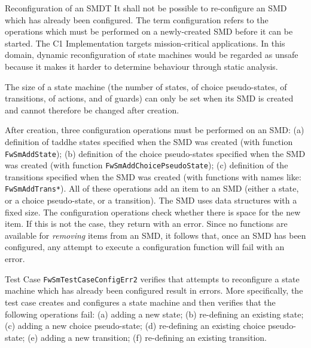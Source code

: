 \documentclass[a4paper,10pt]{article}
\newenvironment{fw_req_note}[7]
{\addtocounter{subsubsection}{1}
	\hspace{0.2cm}\textbf{FW-\arabic{section}.\arabic{subsection}.\arabic{subsubsection}/#2
	\hspace{0.8cm} #1}
	\vspace{-10pt}
\begin{longtable}{p{2.7cm}P{8.5cm}}
\hline
\textsc{Requirement} & #3 \\
\textsc{Note} & #4 \\
\textsc{Justification} & #5 \\
\textsc{Implementation} & #6  \\ 
\textsc{Verification} & #7  \\
\hline
}
{\end{longtable}}
\begin{document}
\begin{fw_req_note}{Reconfiguration of an SMD}{T}
{It shall not be possible to re-configure an SMD which has already been configured.}
{The term configuration refers to the operations which must be performed on a newly-created SMD before it can be started.}
{ The C1 Implementation targets mission-critical applications. 
In this domain, dynamic reconfiguration of state machines would be regarded as unsafe 
because it makes it harder to determine behaviour through static analysis.}
{ The size of a state machine (the number of states, of choice pseudo-states, of transitions, of actions, and of guards) can only be set when its SMD is created and cannot therefore be changed after creation. 

After creation, three configuration operations must be performed on an SMD: (a) definition of taddhe states specified when the SMD was created (with function \texttt{FwSmAddState}); 
(b) definition of the choice pseudo-states specified when the SMD was created (with function \texttt{FwSmAddChoicePseudoState}); 
(c) definition of the transitions specified when the SMD was created (with functions with names like: \texttt{FwSmAddTrans*}). 
All of these operations add an item to an SMD (either a state, or a choice pseudo-state, 
or a transition). 
The SMD uses data structures with a fixed size. The configuration operations 
check whether there is space for the new item. 
If this is not the case, they return with an error. Since no functions are available 
for \emph{removing} items from an SMD, it follows that, once an SMD has been configured, 
any attempt to execute a configuration function will fail with an error.} 
{Test Case \texttt{FwSmTestCaseConfigErr2} verifies that attempts to 
reconfigure a state machine which has already been configured result in errors. 
More specifically, the test case creates and configures a state machine and then verifies 
that the following operations fail: (a) adding a new state; (b) re-defining an existing state; 
(c) adding a new choice pseudo-state; (d) re-defining an existing choice pseudo-state; 
(e) adding a new transition; (f) re-defining an existing transition.}
\end{fw_req_note}
\end{document}
